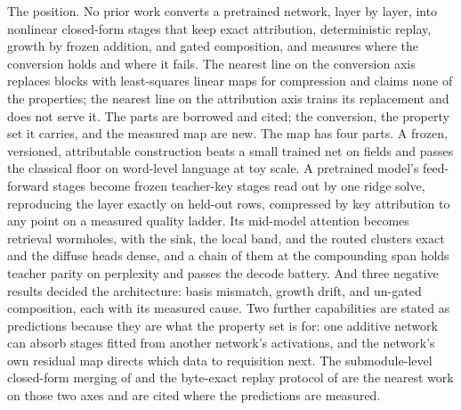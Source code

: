 \documentclass[11pt]{article}
\begin{document}
The position. No prior work converts a pretrained network, layer
by layer, into nonlinear closed-form stages that keep exact
attribution, deterministic replay, growth by frozen addition, and
gated composition, and measures where the conversion holds and
where it fails. The nearest line on the conversion axis replaces
blocks with least-squares linear maps for compression and claims
none of the properties; the nearest line on the attribution axis
trains its replacement and does not serve it. The parts are
borrowed and cited; the conversion, the property set it carries,
and the measured map are new. The map has four parts. A frozen,
versioned, attributable construction beats a small trained net on
fields and passes the classical floor on word-level language at toy
scale. A pretrained model's feed-forward stages become frozen
teacher-key stages read out by one ridge solve, reproducing the
layer exactly on held-out rows, compressed by key attribution to
any point on a measured quality ladder. Its mid-model attention
becomes retrieval wormholes, with the sink, the local band, and
the routed clusters exact and the diffuse heads dense, and a chain
of them at the compounding span holds teacher parity on
perplexity and passes the decode battery. And three negative
results decided the architecture: basis mismatch, growth drift,
and un-gated composition, each with its measured cause. Two further
capabilities are stated as predictions because they are what the
property set is for: one additive network can absorb stages fitted
from another network's activations, and the network's own residual
map directs which data to requisition next. The submodule-level
closed-form merging of \cite{submodlin2025} and the byte-exact
replay protocol of \cite{kvgraft2026} are the nearest work on
those two axes and are cited where the predictions are measured.
\end{document}

